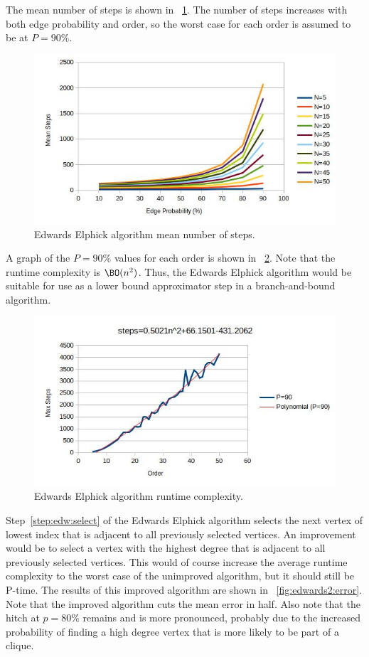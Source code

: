 The mean number of steps is shown in \figurename~\ref{fig:edwards1:steps}.  The number of steps increases with both
edge probability and order, so the worst case for each order is assumed to be at \(P=90\%\).

\begin{figure}[H]
  \centering
  \includegraphics[width=5in]{edwards1_steps}
  \caption{Edwards Elphick algorithm mean number of steps.}
  \label{fig:edwards1:steps}
\end{figure}

A graph of the \(P=90\%\) values for each order is shown in \figurename~\ref{fig:edwards1:runtime}.  Note that the
runtime complexity is \(\BO(n^2)\).  Thus, the Edwards Elphick algorithm would be suitable for use as a lower bound
approximator step in a branch-and-bound algorithm.

\begin{figure}[H]
  \centering
  \includegraphics[width=5in]{edwards1_runtime}
  \caption{Edwards Elphick algorithm runtime complexity.}
  \label{fig:edwards1:runtime}
\end{figure}

Step~\ref{step:edw:select} of the Edwards Elphick algorithm selects the next vertex of lowest index that is
adjacent to all previously selected vertices.  An improvement would be to select a vertex with the highest degree
that is adjacent to all previously selected vertices.  This would of course increase the average runtime complexity
to the worst case of the unimproved algorithm, but it should still be P-time.  The results of this improved
algorithm are shown in \figurename~\ref{fig:edwards2:error}.  Note that the improved algorithm cuts the mean error
in half.  Also note that the hitch at \(p=80\%\) remains and is more pronounced, probably due to the increased
probability of finding a high degree vertex that is more likely to be part of a clique.

